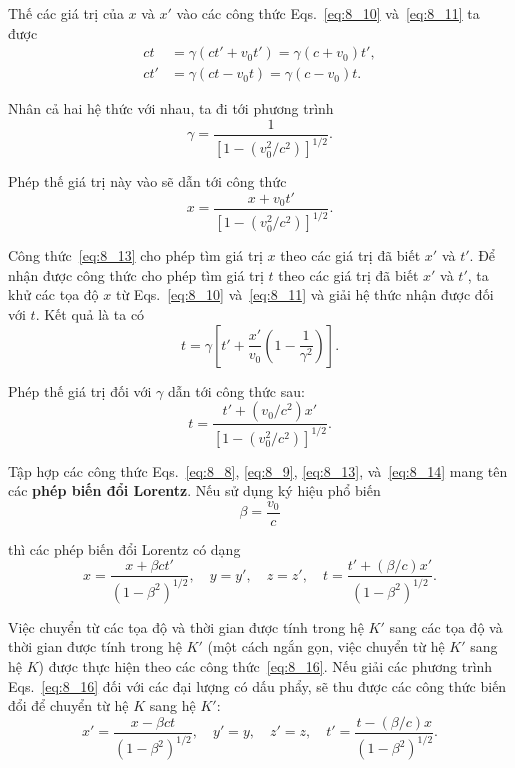 \noindent
Thế các giá trị của $x$ và $x'$ vào các công thức Eqs.~\eqref{eq:8_10} và~\eqref{eq:8_11} ta được
\begin{align*}
	ct  &= \gamma (ct' + v_0 t') = \gamma (c + v_0)t',\\
	ct' &= \gamma (ct - v_0 t) = \gamma (c - v_0)t.
\end{align*}

Nhân cả hai hệ thức với nhau, ta đi tới phương trình
\begin{equation}\label{eq:8_12}
	\gamma = \frac{1}{\left[1 - \left(v_0^2/c^2\right)\right]^{1/2}}.
\end{equation}

\noindent
Phép thế giá trị này vào  sẽ dẫn tới công thức
\begin{equation}\label{eq:8_13}
	x = \frac{x + v_0 t'}{\left[1 - \left(v_0^2/c^2\right)\right]^{1/2}}.
\end{equation}

Công thức~\eqref{eq:8_13} cho phép tìm giá trị $x$ theo các giá trị đã biết $x'$ và $t'$. Để nhận được công thức cho phép tìm giá trị $t$ theo các giá trị đã biết $x'$ và $t'$, ta khử các tọa độ $x$ từ Eqs.~\eqref{eq:8_10} và~\eqref{eq:8_11} và giải hệ thức nhận được đối với $t$. Kết quả là ta có
\begin{equation*}
	t = \gamma \left[t' + \frac{x'}{v_0}\left(1 - \frac{1}{\gamma^2}\right)\right].
\end{equation*}

\noindent
Phép thế giá trị  đối với $\gamma$ dẫn tới công thức sau:
\begin{equation}\label{eq:8_14}
	t = \frac{t' + (v_0/c^2) x'}{\left[1 - \left(v_0^2/c^2\right)\right]^{1/2}}.
\end{equation}

Tập hợp các công thức Eqs.~\eqref{eq:8_8}, \eqref{eq:8_9}, \eqref{eq:8_13}, và~\eqref{eq:8_14} mang tên các \textbf{phép biến đổi Lorentz}. Nếu sử dụng ký hiệu phổ biến
\begin{equation}\label{eq:8_15}
	\beta = \frac{v_0}{c}
\end{equation}

\noindent
thì các phép biến đổi Lorentz có dạng
\begin{equation}\label{eq:8_16}
	x = \frac{x + \beta ct'}{\left(1 - \beta^2\right)^{1/2}},\quad y = y',\quad z = z',\quad t = \frac{t' + (\beta/c) x'}{\left(1 - \beta^2\right)^{1/2}}.
\end{equation}

Việc chuyển từ các tọa độ và thời gian được tính trong hệ $K'$ sang các tọa độ và thời gian được tính trong hệ $K'$ (một cách ngắn gọn, việc chuyển từ hệ $K'$ sang hệ $K$) được thực hiện theo các công thức~\eqref{eq:8_16}. Nếu giải các phương trình Eqs.~\eqref{eq:8_16}  đối với các đại lượng có dấu phẩy, sẽ thu được các công thức biến đổi để chuyển từ hệ $K$ sang hệ $K'$:
\begin{equation}\label{eq:8_17}
	x' = \frac{x - \beta ct}{\left(1 - \beta^2\right)^{1/2}},\quad y' = y,\quad z' = z,\quad t' = \frac{t - (\beta/c) x}{\left(1 - \beta^2\right)^{1/2}}.
\end{equation}

